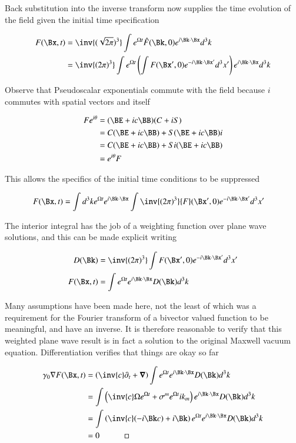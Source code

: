 Back substitution into the inverse transform now supplies the time evolution of the field given the initial time specification

\begin{align*}
F(\Bx,t)
&= \inv{(\sqrt{2\pi})^3} \int e^{\Omega t} \hat{F}(\Bk,0) e^{i \Bk \cdot \Bx} d^3 k \\
&= \inv{(2\pi)^3} \int e^{\Omega t} \left( \int {F}(\Bx',0) e^{-i \Bk \cdot \Bx'} d^3 x' \right) e^{i \Bk \cdot \Bx} d^3 k
\end{align*}

Observe that Pseudoscalar exponentials commute with the field because $i$ commutes with spatial vectors and itself

\begin{align*}
F e^{i\theta}
&= (\BE + i c \BB) (C + iS) \\
&=
C (\BE + i c \BB)
+ S (\BE + i c \BB) i  \\
&=
C (\BE + i c \BB)
+ S i (\BE + i c \BB) \\
&=
e^{i\theta} F
\end{align*}

This allows the specifics of the initial time conditions to be suppressed

\begin{align}
F(\Bx,t) &= \int d^3 k e^{\Omega t} e^{i \Bk \cdot \Bx} \int \inv{(2\pi)^3} {F}(\Bx',0) e^{-i \Bk \cdot \Bx'}  d^3 x'
\end{align}

The interior integral has the job of a weighting function over plane wave solutions, and this can be made explicit writing

\begin{align}
D(\Bk) &= \inv{(2\pi)^3} \int {F}(\Bx',0) e^{-i \Bk \cdot \Bx'}  d^3 x' \\
F(\Bx,t) &= \int e^{\Omega t} e^{i \Bk \cdot \Bx} D(\Bk) d^3 k
\end{align}

Many assumptions have been made here, not the least of which was a requirement for the Fourier transform of a bivector valued function to be meaningful, and have an inverse.  It is therefore reasonable to verify that this weighted plane wave result is in fact a solution to the original Maxwell vacuum equation.  Differentiation verifies that things are okay so far

\begin{align*}
\gamma_0 \grad F(\Bx,t)
&=
\left(\inv{c}\partial_t + \spacegrad \right)\int e^{\Omega t} e^{i \Bk \cdot \Bx} D(\Bk) d^3 k \\
&=
\int \left(\inv{c}\Omega e^{\Omega t} + \sigma^m e^{\Omega t} i k_m \right) e^{i \Bk \cdot \Bx} D(\Bk) d^3 k \\
&=
\int \left(\inv{c}(-i \Bk c) + i \Bk \right) e^{\Omega t} e^{i \Bk \cdot \Bx} D(\Bk) d^3 k \\
&= 0 \quad\quad\quad\square
\end{align*}

